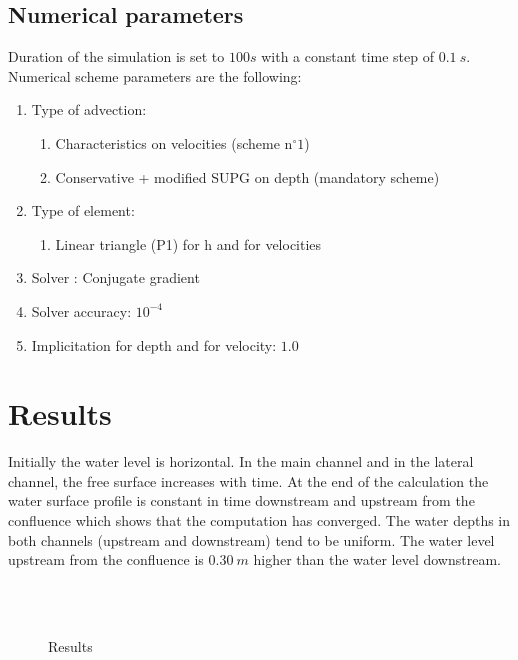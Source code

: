 \subsection{Numerical parameters}
%
Duration of the simulation is set to $100s$ with a constant time step of $0.1~s$.
Numerical scheme parameters are the following:
\begin{enumerate}
  \item[\textendash] Type of advection:
  \begin{enumerate}
    \item[\textbullet] Characteristics on velocities (scheme n$^{\circ}1$)
    \item[\textbullet] Conservative + modified SUPG on depth (mandatory scheme)
  \end{enumerate}
  \item[\textendash] Type of element:
  \begin{enumerate}
    \item[\textbullet] Linear triangle (P1) for h and for velocities
  \end{enumerate}
  \item[\textendash] Solver : Conjugate gradient
  \item[\textendash] Solver accuracy: $10^{-4}$
  \item[\textendash] Implicitation for depth and for velocity: $1.0$
\end{enumerate}


%
%
%
\section{Results}

Initially the water level is horizontal.
In the main channel and in the lateral channel, the free surface increases with
time.
At the end of the calculation the water surface profile is constant in time
downstream and upstream from the confluence which shows that the computation has
converged.
The water depths in both channels (upstream and downstream) tend to be uniform.
The water level upstream from the confluence is $0.30~m$ higher than the water
level downstream.

\begin{figure}[H]
  \centering
   \\
  \\
  \caption{Results}\label{t2d:confluence:results}
\end{figure}

